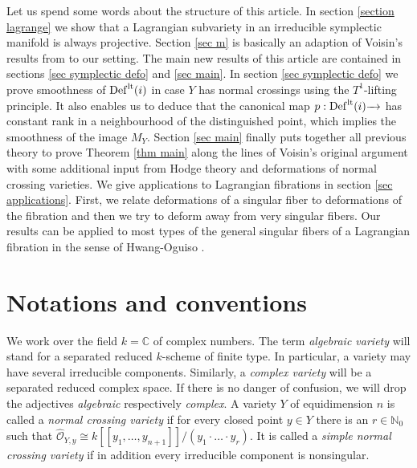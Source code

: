 \documentclass[a4paper,11pt,final]{amsart}
\theoremstyle{plain}
\theoremstyle{definition}
\numberwithin{equation}{section}
\theoremstyle{remark}
\begin{document}
Let us spend some words about the structure of this article. 
In section \ref{section lagrange} we show that a Lagrangian subvariety in an irreducible symplectic manifold is always projective. Section \ref{sec m} is basically an adaption of Voisin's results from \cite{Vo92} to our setting. The main new results of this article are contained in sections \ref{sec symplectic defo} and \ref{sec main}. In section \ref{sec symplectic defo} we prove smoothness of ${{\operatorname{Def}}}^{{\rm{lt}}}(i)$ in case $Y$ has normal crossings using the $T^1$-lifting principle. It also enables us to deduce that the canonical map $p:{{\operatorname{Def}}}^{{\rm{lt}}}(i) {\xrightarrow{\ \ }}$ has constant rank in a neighbourhood of the distinguished point, which implies the smoothness of the image $M_Y$.
Section \ref{sec main} finally puts together all previous theory to prove Theorem \ref{thm main} along the lines of Voisin's original argument with some additional input from Hodge theory and deformations of normal crossing varieties.
We give applications to Lagrangian fibrations in section \ref{sec applications}. First, we relate deformations of a singular fiber to deformations of the fibration and then we try to deform away from very singular fibers. Our results can be applied to most types of the general singular fibers of a Lagrangian fibration in the sense of Hwang-Oguiso \cite{HO07}. 

\section*{Notations and conventions}\label{subsec notation}

We work over the field $k={{\mathbb C}}$ of complex numbers.
The term \emph{algebraic variety} will stand for a separated reduced $k$-scheme of finite type. In particular, a variety may have several irreducible components. Similarly, a \emph{complex variety} will be a separated reduced complex space. If there is no danger of confusion, we will drop the adjectives \emph{algebraic }respectively \emph{complex}. 
A variety $Y$ of equidimension $n$ is called a \emph{normal crossing variety} if for every closed point $y\in Y$ there is an $r\in{{\mathbb N}}_0$ such that $\widehat{{\mathcal O}}_{Y,y} {\cong} k[[ y_1,\ldots,y_{n+1}]]/(y_1\cdot\ldots\cdot y_r)$. It is called a \emph{simple normal crossing variety} if in addition every irreducible component is nonsingular. 
\end{document}
